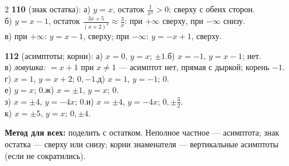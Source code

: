 \documentclass[11pt]{extarticle}
\begin{document}
\begin{multicols}{2}
\textbf{110} (знак остатка):
а) $y=x$, остаток $\frac1{x^2}>0$: сверху с обеих сторон.\\
б) $y=x-1$, остаток $\frac{3x+5}{(x+2)^2}\approx\frac3x$: при $+\infty$ сверху, при $-\infty$ снизу.\\
в) при $+\infty$: $y=x-1$, сверху; при $-\infty$: $y=-x+1$, сверху.

\textbf{112} (асимптоты; корни):
а) $x=0$, $y=x$; $\pm1$.\quad б) $x=-1$, $y=x-1$; нет.\\
в) \emph{ловушка:} $=x+1$ при $x\ne1$ — асимптот нет, прямая с дыркой; корень $-1$.\\
г) $x=1$, $y=x+2$; $0,-1$.\quad д) $x=1$, $y=-1$; $0$.\\
е) $y=x$; $0$.\quad ж) $x=\pm1$, $y=x$; $0$.\\
з) $x=\pm4$, $y=-4x$; $0$.\quad и) $x=\pm4$, $y=-4x$; $0,\pm\frac32$.\\
к) $x=\pm5$, $y=x$; $0,\pm4$.

\medskip
{\sffamily\bfseries Метод для всех: } поделить с остатком. Неполное частное — асимптота; знак остатка — сверху или снизу; корни знаменателя — вертикальные асимптоты (если не сократились).
\end{multicols}
\end{document}

